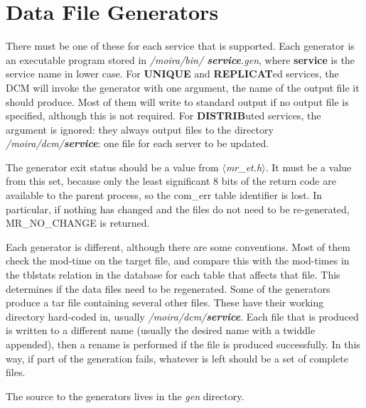 \section{Data File Generators}

There must be one of these for each service that is supported. Each
generator is an executable program stored in {\it /moira/bin/{\bf
service}.gen}, where {\bf service} is the service name in lower case.
For {\bf UNIQUE} and {\bf REPLICAT}ed services, the DCM will invoke
the generator with one argument, the name of the output file it should
produce. Most of them will write to standard output if no output file
is specified, although this is not required. For {\bf DISTRIB}uted
services, the argument is ignored: they always output files to the
directory {\it /moira/dcm/{\bf service}\/}: one file for each server
to be updated.

The generator exit status should be a value from {\em
$\langle$mr\_et.h$\rangle$}. It must be a value from this set, because
only the least significant 8 bits of the return code are available to
the parent process, so the com\_err table identifier is lost. In
particular, if nothing has changed and the files do not need to be
re-generated, MR\_NO\_CHANGE is returned.

Each generator is different, although there are some conventions.
Most of them check the mod-time on the target file, and compare this
with the mod-times in the tblstats relation in the database for each
table that affects that file.  This determines if the data files need
to be regenerated.  Some of the generators produce a tar file
containing several other files.  These have their working directory
hard-coded in, usually {\it /moira/dcm/{\bf service}}.  Each file that is
produced is written to a different name (usually the desired name with
a twiddle appended), then a rename is performed if the file is
produced successfully.  In this way, if part of the generation fails,
whatever is left should be a set of complete files.

The source to the generators lives in the {\it gen\/} directory.


